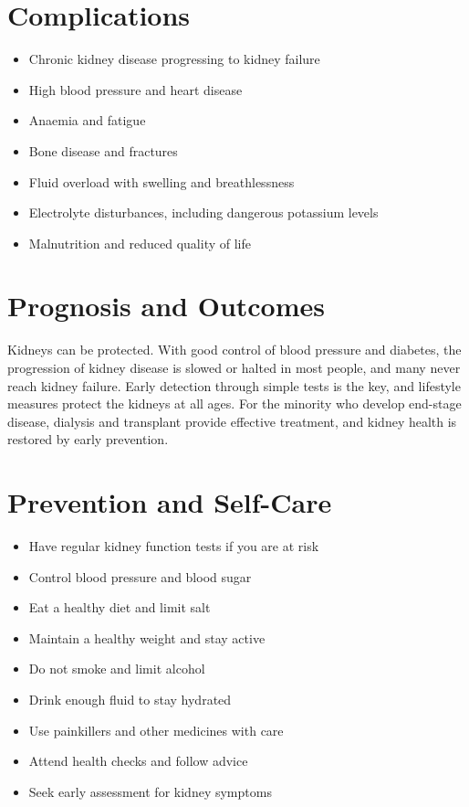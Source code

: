 \section*{Complications}
\begin{itemize}
    \item Chronic kidney disease progressing to kidney failure
    \item High blood pressure and heart disease
    \item Anaemia and fatigue
    \item Bone disease and fractures
    \item Fluid overload with swelling and breathlessness
    \item Electrolyte disturbances, including dangerous potassium levels
    \item Malnutrition and reduced quality of life
\end{itemize}

\section*{Prognosis and Outcomes}
Kidneys can be protected. With good control of blood pressure and diabetes, the progression of kidney disease is slowed or halted in most people, and many never reach kidney failure. Early detection through simple tests is the key, and lifestyle measures protect the kidneys at all ages. For the minority who develop end-stage disease, dialysis and transplant provide effective treatment, and kidney health is restored by early prevention.

\section*{Prevention and Self-Care}
\begin{itemize}
    \item Have regular kidney function tests if you are at risk
    \item Control blood pressure and blood sugar
    \item Eat a healthy diet and limit salt
    \item Maintain a healthy weight and stay active
    \item Do not smoke and limit alcohol
    \item Drink enough fluid to stay hydrated
    \item Use painkillers and other medicines with care
    \item Attend health checks and follow advice
    \item Seek early assessment for kidney symptoms
\end{itemize}

